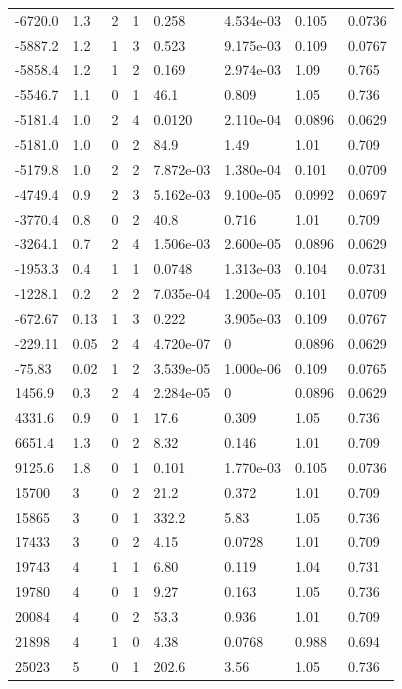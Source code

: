 \documentclass[preview]{standalone}
\begin{document}
{{\begin{tabular}{L{1.2cm}C{1.2cm} C{0.3cm}C{0.5cm} C{1.4cm}C{1.4cm} C{1.4cm}C{1.4cm}}
  -6720.0  &   1.3  & 2     &  1 &  0.258  & 4.534e-03  & 0.105 &  0.0736   \\ 
  -5887.2  &   1.2  & 1     &  3 &  0.523  & 9.175e-03  & 0.109 &  0.0767   \\ 
  -5858.4  &   1.2  & 1     &  2 &  0.169  & 2.974e-03  & 1.09 &  0.765   \\ 
  -5546.7  &   1.1  & 0     &  1 &  46.1  & 0.809  & 1.05 &  0.736   \\ 
  -5181.4  &   1.0  & 2     &  4 &  0.0120  & 2.110e-04  & 0.0896 &  0.0629   \\ 
  -5181.0  &   1.0  & 0     &  2 &  84.9  & 1.49  & 1.01 &  0.709   \\ 
  -5179.8  &   1.0  & 2     &  2 &  7.872e-03  & 1.380e-04  & 0.101 &  0.0709   \\ 
  -4749.4  &   0.9  & 2     &  3 &  5.162e-03  & 9.100e-05  & 0.0992 &  0.0697   \\ 
  -3770.4  &   0.8  & 0     &  2 &  40.8  & 0.716  & 1.01 &  0.709   \\ 
  -3264.1  &   0.7  & 2     &  4 &  1.506e-03  & 2.600e-05  & 0.0896 &  0.0629   \\ 
  -1953.3  &   0.4  & 1     &  1 &  0.0748  & 1.313e-03  & 0.104 &  0.0731   \\ 
  -1228.1  &   0.2  & 2     &  2 &  7.035e-04  & 1.200e-05  & 0.101 &  0.0709   \\ 
  -672.67  &  0.13  & 1     &  3 &  0.222  & 3.905e-03  & 0.109 &  0.0767   \\ 
  -229.11  &  0.05  & 2     &  4 &  4.720e-07  & 0  & 0.0896 &  0.0629   \\ 
  -75.83  &  0.02  & 1     &  2 &  3.539e-05  & 1.000e-06  & 0.109 &  0.0765   \\ 
  1456.9  &   0.3  & 2     &  4 &  2.284e-05  & 0  & 0.0896 &  0.0629   \\ 
  4331.6  &   0.9  & 0     &  1 &  17.6  & 0.309  & 1.05 &  0.736   \\ 
  6651.4  &   1.3  & 0     &  2 &  8.32  & 0.146  & 1.01 &  0.709   \\ 
  9125.6  &   1.8  & 0     &  1 &  0.101  & 1.770e-03  & 0.105 &  0.0736   \\ 
  15700  &     3  & 0     &  2 &  21.2  & 0.372  & 1.01 &  0.709   \\ 
  15865  &     3  & 0     &  1 &  332.2  & 5.83  & 1.05 &  0.736   \\ 
  17433  &     3  & 0     &  2 &  4.15  & 0.0728  & 1.01 &  0.709   \\ 
  19743  &     4  & 1     &  1 &  6.80  & 0.119  & 1.04 &  0.731   \\ 
  19780  &     4  & 0     &  1 &  9.27  & 0.163  & 1.05 &  0.736   \\ 
  20084  &     4  & 0     &  2 &  53.3  & 0.936  & 1.01 &  0.709   \\ 
  21898  &     4  & 1     &  0 &  4.38  & 0.0768  & 0.988 &  0.694   \\ 
  25023  &     5  & 0     &  1 &  202.6  & 3.56  & 1.05 &  0.736   \\ 
\hline 
\end{tabular} 

}}
\end{document}
